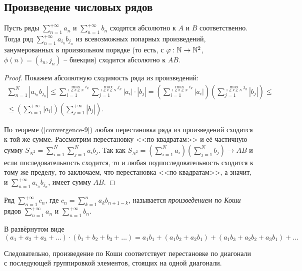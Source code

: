 
\subsection{Произведение числовых рядов}

\begin{theorem}[Коши]
    Пусть ряды $\sum_{n = 1}^{+\infty} a_n$ и $\sum_{n = 1}^{+\infty} b_n$ сходятся абсолютно к $A$ и $B$ соответственно. Тогда ряд $\sum_{n = 1}^{+\infty} a_{i_n} b_{j_n}$ из всевозможных попарных произведений, занумерованных в произвольном порядке (то есть, с $\varphi : \mathbb{N} \rightarrow \mathbb{N}^2$, $\phi(n) = (i_n, j_n)$ -- биекция) сходится абсолютно к $AB$.

    \begin{proof}
        Покажем абсолютную сходимость ряда из произведений:
        \begin{gather*}
            \sum_{n = 1}^N |a_{i_n} b_{j_n}| \le \sum_{i = 1}^{\max_{1 \le k \le N} i_k} \sum_{j = 1}^{\max_{1 \le k \le N} j_k} |a_i| \cdot |b_j| = \left(\sum_{i = 1}^{\max_{1 \le k \le N} i_k} |a_i|\right)\left(\sum_{j = 1}^{\max_{1 \le k \le N} j_k} |b_j|\right) \le\\\le \left(\sum_{i = 1}^{+\infty} |a_i|\right)\left(\sum_{j = 1}^{+\infty} |b_j|\right).
        \end{gather*}

        По теореме (\ref{convergence-9}) любая перестановка ряда из произведений сходится к той же сумме. Рассмотрим перестановку <<по квадратам>> и её частичную сумму $S_{N^2} = \sum_{i = 1}^N \sum_{j = 1}^N a_i b_j$. Так как $S_{N^2} = \left(\sum_{i = 1}^N a_i\right)\left(\sum_{j = 1}^N b_j\right) \rightarrow AB$ и если последовательность сходится, то и любая подпоследовательность сходится к тому же пределу, то заключаем, что перестановка <<по квадратам>>, а значит, и $\sum_{n = 1}^{+\infty} a_{i_n} b_{j_n}$, имеет сумму $AB$.
    \end{proof}
\end{theorem}

\begin{definition}
    Ряд $\sum_{n = 1}^{+\infty} c_n$, где $c_n = \sum_{k = 1}^n a_k b_{n + 1 - k}$, называется \emph{произведением по Коши} рядов $\sum_{n = 1}^{+\infty} a_n$ и $\sum_{n = 1}^{+\infty} b_n$.
\end{definition}

\begin{note}
    В развёрнутом виде
    \[
        (a_1 + a_2 + a_3 + \ldots) \cdot (b_1 + b_2 + b_3 + \ldots) = a_1 b_1 + (a_1 b_2 + a_2 b_1) + (a_1 b_3 + a_2 b_2 + a_3 b_1) + \ldots
    \]

    Следовательно, произведение по Коши соответствует перестановке по диагонали с последующей группировкой элементов, стоящих на одной диагонали.
\end{note}

